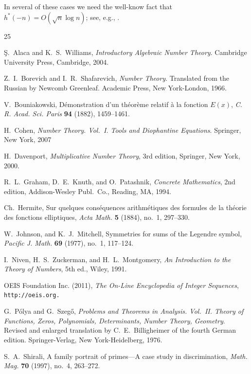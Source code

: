 \documentclass{amsart}
\theoremstyle{plain}
\numberwithin{equation}{section}
\begin{document}
In several of these cases we need the well-know fact that 
$h^*(-n) = O(\sqrt{n}\log{n})$; see, e.g., \cite[p.~138]{Co1}.



\begin{thebibliography}{25}

 {\c S}.~Alaca and K.~S.~Williams, {\it Introductory Algebraic 
Number Theory\/}. Cambridge University Press, Cambridge, 2004. 

 Z.~I.~Borevich and I.~R.~Shafarevich, {\it Number Theory\/}. 
Translated from the Russian by Newcomb Greenleaf. Academic Press, 
New York-London, 1966.

 V.~Bouniakowski, D\'emonstration d'un th\'eor\`eme relatif \`a
la fonction $E(x)$, {\it C. R. Acad. Sci. Paris} {\bf 94} (1882), 1459--1461.

 H.~Cohen, {\it Number Theory. Vol.~I. Tools and Diophantine 
Equations\/}. Springer, New York, 2007

 H.~Davenport, {\it Multiplicative Number Theory\/}, 3rd edition,
Springer, New York, 2000.

 R.~L.~Graham, D.~E.~Knuth, and O.~Patashnik,
{\it Concrete Mathematics\/}, 2nd edition, Addison-Wesley Publ.~Co.,
Reading, MA, 1994.

 Ch.~Hermite, Sur quelques cons\'equences arithm\'etiques des 
formules de la th\'eorie des fonctions elliptiques, {\it Acta Math.} {\bf 5}
(1884), no.~1, 297--330.

 W.~Johnson, and K.~J.~Mitchell, Symmetries for sums of the 
Legendre symbol, {\it Pacific J. Math.} {\bf 69} (1977), no.~1, 117--124. 

 I.~Niven, H.~S.~Zuckerman, and H.~L.~Montgomery,
{\it An Introduction to the Theory of Numbers\/}, 5th ed., Wiley, 1991.

OEIS Foundation Inc. (2011), {\it The On-Line Encyclopedia of Integer 
Sequences},\\
\tt{http://oeis.org}.\rm

 G.~P\'olya and G.~Szeg{\H o}, {\it Problems and Theorems in 
Analysis. Vol.~II. Theory of Functions, Zeros, Polynomials, Determinants, 
Number Theory, Geometry\/}. Revised and enlarged translation by 
C.~E.~Billigheimer of the fourth German edition. Springer-Verlag, 
New York-Heidelberg, 1976.

 S.~A.~Shirali, A family portrait of primes---A case study in 
discrimination, {\it Math. Mag.} {\bf 70} (1997), no.~4, 263--272. 

\end{thebibliography}
\end{document}
